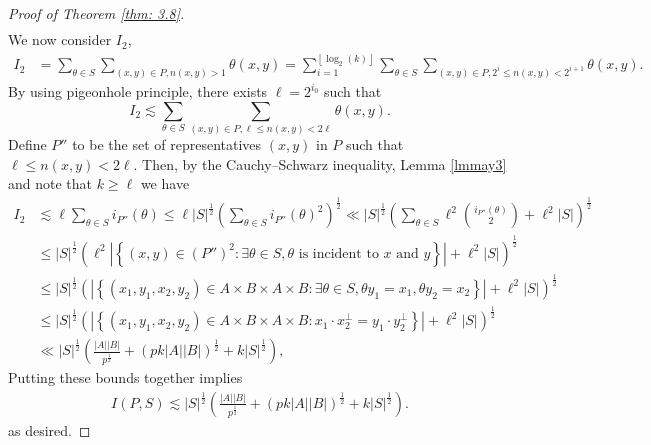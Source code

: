 \documentclass[11pt]{article}
\def\Fbb{\mathbb{F}}
\def\l({\left(}
\def\r){\right)}
\def\lv{\left\vert}
\def\rv{\right\vert}
\def\lo{\left\{}
\def\ro{\right\}}
\def\lf{\left\lfloor}
\def\rf{\right\rfloor}
\begin{document}
\begin{proof}[Proof of Theorem \ref{thm: 3.8}]
\begin{align*}
\end{align*}
We now consider $I_2$,
\begin{align*}
    I_2 &= \sum_{\theta \in S}\sum_{(x,y) \in P , n(x,y)>1} \theta (x,y)=\sum_{i=1}^{\lf \log_2 (k) \rf} \sum_{\theta\in S}\sum_{(x, y)\in P, 2^i \le n(x, y) < 2^{i+1}}\theta(x, y) .
\end{align*}
By using pigeonhole principle, there exists $\ell =2^{i_0} $ such that
\[ I_2 \lesssim \sum_{\theta\in S}\sum_{(x, y)\in P, \ell \le n(x, y)< 2\ell}\theta(x, y) . \]
Define $P''$ to be the set of representatives $(x, y)$ in $P$ such that $\ell \le n(x, y)< 2\ell$. Then, by the Cauchy--Schwarz inequality, Lemma \ref{lmmay3} and note that $k \ge \ell$ we have 
\begin{align*}
    I_2 & \lesssim \ell\sum_{\theta\in S}i_{P''}(\theta) \le \ell |S|^{\frac{1}{2}}\left(\sum_{\theta \in S}i_{P''}(\theta)^2\right)^{\frac{1}{2}}  \ll \lv S\rv^{\frac{1}{2}} \l( \sum_{\theta \in S}\ell^2 \binom{i_{P''}(\theta)}{2} + \ell^2\lv S\rv \r)^{\frac{1}{2}} \\
    & \le \lv S\rv^{\frac{1}{2}}  \l( \ell^2 \lv \lo  (x,y) \in (P'')^2\colon \exists \theta \in S , \theta \text{ is incident to $x$ and $y$} \ro \rv +\ell^2 \lv S\rv \r)^{\frac{1}{2}} \\
    & \le \lv S\rv^{\frac{1}{2}} \l( \lv \lo \l( x_1,y_1,x_2,y_2 \r) \in A\times B\times A \times B \colon \exists \theta \in S , \theta y_1 =x_1 ,\theta y_2 =x_2 \ro \rv +\ell^2 \lv S\rv \r)^{\frac{1}{2}}\\
    & \le \lv S\rv^{\frac{1}{2}} \l( \lv \lo \l( x_1,y_1,x_2,y_2 \r) \in A\times B\times A \times B \colon x_1\cdot x_2^\perp =y_1\cdot y_2^\perp \ro \rv +\ell^2 \lv S\rv \r)^{\frac{1}{2}}\\
    & \ll \lv S\rv^{\frac{1}{2}} \l(  \frac{|A||B|}{p^{\frac{1}{2}}} + (pk|A||B|)^{\frac{1}{2}} + k\lv S\rv^{\frac{1}{2}} \r) ,
\end{align*} 
Putting these bounds together implies
\begin{align*}
    I(P,S) \lesssim \lv S\rv^{\frac{1}{2}} \l(  \frac{|A||B|}{p^{\frac{1}{2}}} + (pk|A||B|)^{\frac{1}{2}} + k\lv S\rv^{\frac{1}{2}} \r).
\end{align*}
as desired.
\end{proof}
\end{document}
